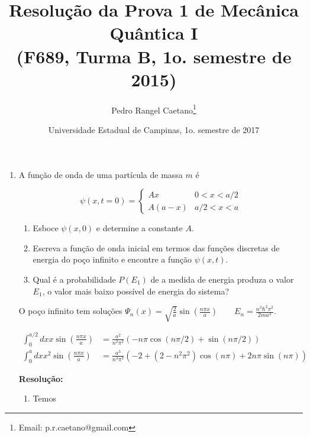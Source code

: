 \documentclass[a4paper, 12pt, notitlepage]{article}
\begin{document}
\title{Resolução da Prova 1 de Mecânica Quântica I\\ (F689, Turma B, 1o. semestre de 2015)}
\author{Pedro Rangel Caetano\footnote{Email: p.r.caetano@gmail.com}} 
\date{Universidade Estadual de Campinas, 1o. semestre de 2017}
\maketitle


\begin{enumerate}

\item A função de onda de uma partícula de massa $m$ é

\begin{equation*}
\psi(x, t=0) =
  \begin{cases}
    Ax & 0 < x < a/2 \\
    A(a-x) & a/2 < x < a
  \end{cases}
\end{equation*}

\begin{enumerate}
  \item Esboce $\psi(x, 0)$ e determine a constante $A$.
  \item Escreva a função de onda inicial em termos das funções discretas de energia do poço infinito e encontre a função $\psi(x,t)$.
  \item Qual é a probabilidade $P(E_1)$ de a medida de energia produza o valor $E_1$, o valor mais baixo possível de energia do sistema?
\end{enumerate}

O poço infinito tem soluções $\Psi_n(x) = \sqrt{\frac{2}{a}}\sin\left(\frac{n\pi x}{a}\right)\qquad E_n=\frac{n^2\hbar^2\pi^2}{2ma^2}$.

\begin{align*}
\int_0^{a/2} dx x \sin\left(\frac{n\pi x}{a}\right) &= \frac{a^2}{n^2\pi^2}\left(-n\pi\cos(n\pi/2) + \sin(n\pi/2)\right) \\
\int_0^a dx x^2 \sin\left(\frac{n\pi x}{a}\right) &= \frac{a^3}{n^3 \pi^3}\left(-2 + (2 - n^2\pi^2)\cos(n\pi) + 2n\pi\sin(n\pi)\right)
\end{align*}

\textbf{Resolução: }

\begin{enumerate}
  \item Temos
  

\end{enumerate}
\end{enumerate}
\end{document}
